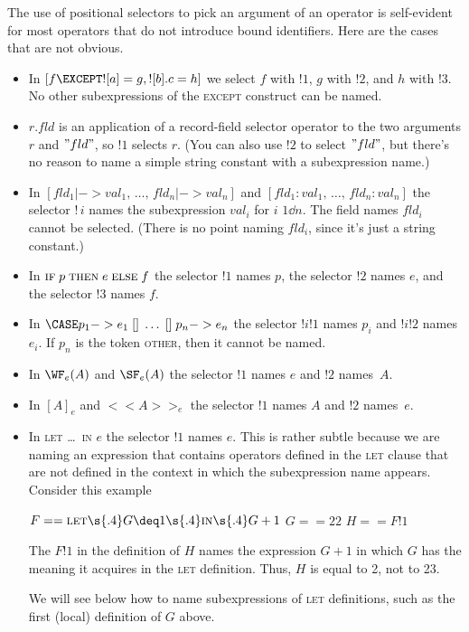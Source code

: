 \documentclass[fleqn,leqno]{article}
\begin{document}
The use of positional selectors to pick an argument of an operator is
self-evident for most operators that do not introduce bound
identifiers.  Here are the cases that are not obvious.
\begin{itemize}
\item In  $[f \EXCEPT ![a] = g, ![b].c = h]$   we select 
$f$ with $!1$,
$g$ with $!2$, and
$h$ with $!3$.
No other subexpressions of the \textsc{except} construct can be named.

\item $r.fld$  is an application of a record-field selector operator to
the two arguments $r$ and $"fld"$, so $!1$ selects $r$.  (You can also
use $!2$ to select $"fld"$, but there's no reason to name a simple
string constant with a subexpression name.)

\item In  $[fld_{1} |-> val_{1},\, \ldots,\, fld_{n} |-> val_{n}]$ 
 and
    $[fld_{1} : val_{1}, \, \ldots,\, fld_{n} : val_{n}]$ 
  \linebreak
the selector $!\,i$ names the subexpression $val_{i}$ for $i$ \in
$1\dd n$.  The field names $fld_{i}$ cannot be selected.  (There is
no point naming $fld_{i}$, since it's just a string constant.)

\item In 
  $\textsc{if} \; p \; \textsc{then}\;e \; \textsc{else}\; f$  
the selector $!1$ names $p$, the selector $!2$ names $e$, and the selector 
$!3$ names $f$.

\item In   
 $\CASE p_{1} -> e_{1} \;[]\; \ldots \;[]\; p_{n} -> e_{n}$   
the selector $!i!1$ names $p_{i}$ and $!i!2$ names $e_{i}$.  If
$p_{n}$ is the token \textsc{other}, then it cannot be named.

\item In   $\WF_e(A)$  and  $\SF_e(A)$ 
the selector $!1$ names $e$ and $!2$ names~$A$.

\item In   $[A]_e$  and  $<<A>>_e$ 
the selector $!1$ names $A$ and $!2$ names~$e$.


\item In  
  \textsc{let} \ldots \ \textsc{in} $e$  
the selector $!1$
names $e$.  This is rather subtle because we are naming an expression
that contains operators defined in the \textsc{let} clause that are
not defined in the context in which the subexpression name appears.
Consider this example
\begin{display}
$F == \textsc{let} \s{.4} G \deq 1 \s{.4} \textsc{in}  \s{.4} G+1$ 
$G == 22$
$H == F!1$
\end{display}
The $F!1$ in the definition of $H$ names the expression $G+1$ in which
$G$ has the meaning it acquires in the \textsc{let} definition.  Thus,
$H$ is equal to 2, not to 23.  

We will see below how to name subexpressions of \textsc{let}
definitions, such as the first (local) definition of $G$ above.
\end{itemize}
\end{document}
